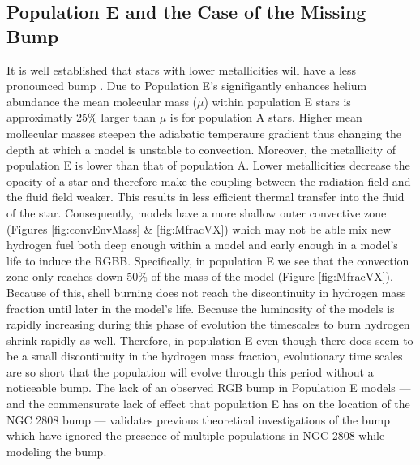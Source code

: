 \subsection{Population E and the Case of the Missing Bump}
It is well established that stars with lower metallicities will have a less
pronounced bump \citep{Cassisi2002, Bjork2006}. Due to Population E's
signifigantly enhances helium abundance the mean molecular mass ($\mu$) within
population E stars is approximatly 25\% larger than $\mu$ is for population A
stars. Higher mean mollecular masses steepen the adiabatic temperaure gradient
thus changing the depth at which a model is unstable to convection. Moreover,
the metallicity of population E is lower than that of population A. Lower
metallicities decrease the opacity of a star and therefore make the coupling
between the radiation field and the fluid field weaker. This results in less
efficient thermal transfer into the fluid of the star. Consequently, models have
a more shallow outer convective zone (Figures \ref{fig:convEnvMass} \&
\ref{fig:MfracVX}) which may not be able mix new hydrogen fuel both deep enough
within a model and early enough in a model's life to induce the RGBB.
Specifically, in population E we see that the convection zone only reaches down
50\% of the mass of the model (Figure \ref{fig:MfracVX}). Because of this,
shell burning does not reach the discontinuity in hydrogen mass fraction until
later in the model's life. Because the luminosity of the models is rapidly
increasing during this phase of evolution the timescales to burn hydrogen
shrink rapidly as well. Therefore, in population E even though there does seem
to be a small discontinuity in the hydrogen mass fraction, evolutionary time
scales are so short that the population will evolve through this period without
a noticeable bump. The lack of an observed RGB bump in Population E models ---
and the commensurate lack of effect that population E has on the location of
the NGC 2808 bump --- validates previous theoretical investigations of the bump
which have ignored the presence of multiple populations in NGC 2808 while
modeling the bump.

